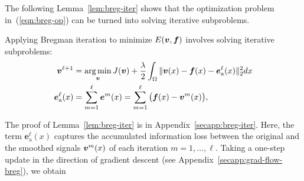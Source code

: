 The following Lemma~\ref{lem:breg-iter} shows that the optimization problem in~(\ref{eqn:breg-op}) can be turned into solving iterative subproblems.
\begin{lemma}
\label{lem:breg-iter}
Applying Bregman iteration to minimize $E({\bm v}, {\bm f})$ involves solving iterative subproblems:
\begin{align} %
    \bv^{\ell + 1} &= \displaystyle \argmin_{\bv} J(\bv) + \frac{\lambda}{2} \int_{\Omega} \|\bv(x) - \bff(x) - \bm{e}^{\ell}_{\mathrm{a}}(x)\|_2^2 dx \nonumber \\
    \bm{e}^{\ell}_{\mathrm{a}}(x) &= \sum_{m = 1}^{\ell} \bm{e}^m(x) = \sum_{m = 1}^{\ell}\big( \bff(x) - \bv^m(x) \big),
 \end{align}
\end{lemma}
The proof of Lemma~\ref{lem:breg-iter} is in Appendix~\ref{secapp:breg-iter}.
Here, the term $\bm{e}^{\ell}_{\mathrm{a}}(x)$ captures the accumulated information loss between the original and the smoothed signals ${\bm v}^m(x)$ of each iteration $m = 1, \dots, \ell$.
Taking a one-step update in the direction of gradient descent (see Appendix~\ref{secapp:grad-flow-breg}), we obtain
